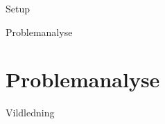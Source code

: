 



\frontmatter %


	\begin{folderinput}{Setup}



\tableofcontents*												%

	\end{folderinput}

\mainmatter %

	\begin{folderinput}{Problemanalyse}
\chapter{Problemanalyse}






	\end{folderinput}

	\begin{folderinput}{Vildledning}

	\end{folderinput}


%

